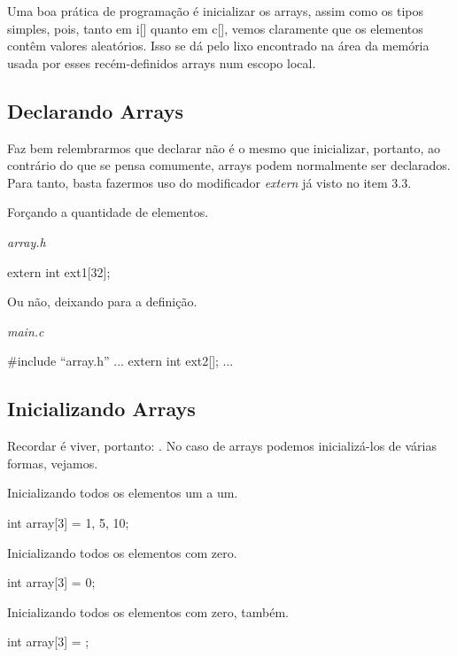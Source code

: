 Uma boa prática de programação é inicializar os arrays, assim como os tipos simples, pois, tanto em i[] quanto em c[], vemos claramente que os elementos contêm valores aleatórios. Isso se dá pelo lixo encontrado na área da memória usada por esses recém-definidos arrays num escopo local.


\subsection{Declarando Arrays}
Faz bem relembrarmos que declarar não é o mesmo que inicializar, portanto, ao contrário do que se pensa comumente, arrays podem normalmente ser declarados. Para tanto, basta fazermos uso do modificador \textit{extern} já visto no item 3.3.

Forçando a quantidade de elementos.

\textit{array.h}\\
\begin{ccode}
extern int ext1[32];
\end{ccode}

Ou não, deixando para a definição.

\textit{main.c}\\
\begin{ccode}
#include ``array.h''
...
extern int ext2[];
...
\end{ccode}


\subsection{Inicializando Arrays}
Recordar é viver, portanto: . No caso de arrays podemos inicializá-los de várias formas, vejamos.

Inicializando todos os elementos um a um.

\begin{ccode}
  int array[3] = {1, 5, 10};
\end{ccode}

Inicializando todos os elementos com zero.

\begin{ccode}
  int array[3] = {0};
\end{ccode}

Inicializando todos os elementos com zero, também.

\begin{ccode}
  int array[3] = {};
\end{ccode}

